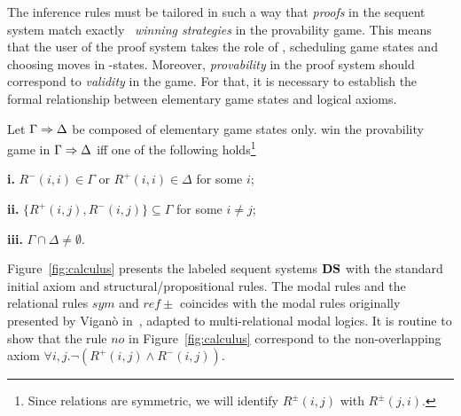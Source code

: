 The inference rules must be tailored in such a way that {\em
proofs} in the sequent system match exactly \My\  {\em winning strategies} in
the provability game. This means that the user of the proof system takes the
role of \Me, scheduling game states and choosing moves in \I-states. 
Moreover, {\em provability} in the proof system should correspond to {\em
validity} in the game. For that,  it is necessary to establish the
formal relationship between elementary game states and logical axioms.


\begin{lemma}\label{lemma:init}
    Let $\Gamma\Rightarrow \Delta$ be composed of elementary game states only. \Ic win the provability game in $\Gamma \Rightarrow \Delta$ iff one of the following holds\footnote{\label{foot:sym}Since relations are symmetric, we will identify $R^\pm(i,j)$ with  $R^\pm(j,i)$.} 
    
    \noindent\textbf{i.} $R^-(i,i)\in\Gamma$ or $R^+(i,i)\in\Delta$ for some $i$;

    \noindent\textbf{ii.} $\{R^+(i,j),R^-(i,j)\}\subseteq\Gamma$ for some $i\not=j$;

    \noindent\textbf{iii.} $\Gamma\cap\Delta\not=\emptyset$.
\end{lemma}

Figure~\ref{fig:calculus} presents the labeled sequent systems $\mathbf{DS}$ with the standard initial axiom and structural/propositional  rules. The modal  rules and the relational rules $sym$ and  $ref\pm$  coincides with the modal rules originally presented by Vigan\`{o} in~\cite{Vigano:2000}, adapted to multi-relational modal logics. 
%
It is routine to show that the rule $no$ in Figure~\ref{fig:calculus} correspond to the non-overlapping  axiom
$
\forall i,j. \neg(R^+(i,j)\wedge R^-(i,j)) 
$.

